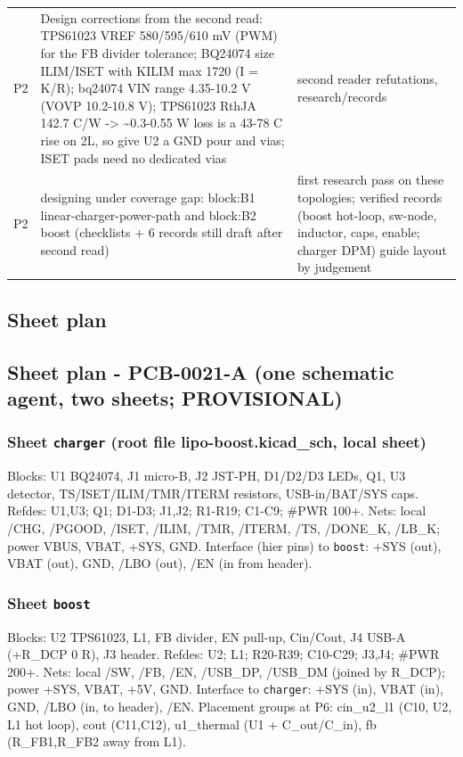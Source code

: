 \documentclass[11pt]{article}
\begin{document}
{\begin{longtable}{lp{5.2cm}p{7.2cm}}
P2 & Design corrections from the second read: TPS61023 VREF 580/595/610 mV (PWM) for the FB divider tolerance; BQ24074 size ILIM/ISET with KILIM max 1720 (I = K/R); bq24074 VIN range 4.35-10.2 V (VOVP 10.2-10.8 V); TPS61023 RthJA 142.7 C/W -\textgreater{} \textasciitilde{}0.3-0.55 W loss is a 43-78 C rise on 2L, so give U2 a GND pour and vias; ISET pads need no dedicated vias & second reader refutations, research/records \\
P2 & designing under coverage gap: block:B1 linear-charger-power-path and block:B2 boost (checklists + 6 records still draft after second read) & first research pass on these topologies; verified records (boost hot-loop, sw-node, inductor, caps, enable; charger DPM) guide layout by judgement \\
\hline
\end{longtable}
}
\subsection*{Sheet plan}
\subsection*{Sheet plan - PCB-0021-A (one schematic agent, two sheets; PROVISIONAL)}
\subsubsection*{Sheet \texttt{charger} (root file lipo-boost.kicad\_sch, local sheet)}
Blocks: U1 BQ24074, J1 micro-B, J2 JST-PH, D1/D2/D3 LEDs, Q1, U3 detector, TS/ISET/ILIM/TMR/ITERM resistors, USB-in/BAT/SYS caps. Refdes: U1,U3; Q1; D1-D3; J1,J2; R1-R19; C1-C9; \#PWR 100+. Nets: local /CHG, /PGOOD, /ISET, /ILIM, /TMR, /ITERM, /TS, /DONE\_K, /LB\_K; power VBUS, VBAT, +SYS, GND. Interface (hier pins) to \texttt{boost}: +SYS (out), VBAT (out), GND, /LBO (out), /EN (in from header).

\subsubsection*{Sheet \texttt{boost}}
Blocks: U2 TPS61023, L1, FB divider, EN pull-up, Cin/Cout, J4 USB-A (+R\_DCP 0 R), J3 header. Refdes: U2; L1; R20-R39; C10-C29; J3,J4; \#PWR 200+. Nets: local /SW, /FB, /EN, /USB\_DP, /USB\_DM (joined by R\_DCP); power +SYS, VBAT, +5V, GND. Interface to \texttt{charger}: +SYS (in), VBAT (in), GND, /LBO (in, to header), /EN. Placement groups at P6: cin\_u2\_l1 (C10, U2, L1 hot loop), cout (C11,C12), u1\_thermal (U1 + C\_out/C\_in), fb (R\_FB1,R\_FB2 away from L1).
\end{document}
